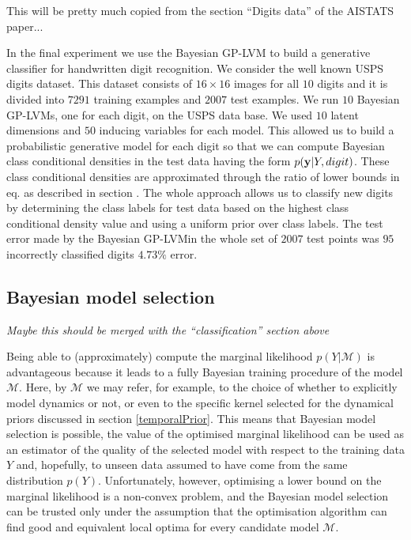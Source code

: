  This will be pretty much copied from the section ``Digits data'' of the AISTATS paper...

In the final experiment we use the Bayesian GP-LVM to
build a generative classifier for handwritten digit recognition.
We consider the well known USPS digits dataset. This
dataset consists of $16 \times 16$ images for all $10$ digits and it
is divided into $7291$ training examples and $2007$ test examples.
We run $10$ Bayesian GP-LVMs, one for each digit,
on the USPS data base. We used $10$ latent dimensions and
$50$ inducing variables for each model. This allowed us to
build a probabilistic generative model for each digit so that
we can compute Bayesian class conditional densities in the
test data having the form $p(\mathbf{y}|Y, digit)$. These class conditional
densities are approximated through the ratio of lower
bounds in eq.  as described in section . The whole approach
allows us to classify new digits by determining the
class labels for test data based on the highest class conditional
density value and using a uniform prior over class
labels. The test error made by the Bayesian GP-LVMin the
whole set of $2007$ test points was $95$ incorrectly classified
digits \ie $4.73\%$ error.



\subsection{Bayesian model selection \label{BayesnaModelSelectionExperiments}}

 \textit{Maybe this should be merged with the ``classification'' section above}

Being able to (approximately) compute the marginal likelihood $p(Y | \mathcal{M})$ 
is advantageous because it leads to a fully Bayesian training procedure of the model $\mathcal{M}$.
Here, by $\mathcal{M}$ we may refer, for example, to the choice of whether to explicitly model
dynamics or not, or even to the specific kernel selected for the
dynamical priors discussed in section \ref{temporalPrior}.
This means that Bayesian model selection is possible, \ie the value of the optimised marginal likelihood
can be used as an estimator of the quality of the selected model with respect to the
training data $Y$ and, hopefully, to unseen data assumed to have come from the same distribution
$p(Y)$. Unfortunately, however, optimising a lower bound on the marginal likelihood is a non-convex
problem, and the Bayesian model selection can be trusted only under the assumption that the optimisation
algorithm can find good and equivalent local optima for every candidate model $\mathcal{M}$.


